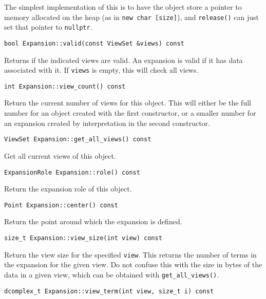The simplest implementation of this is to have the object store a pointer to
memory allocated on the heap (as in \texttt{new char [size]}), and
\texttt{release()} can just set that pointer to \texttt{nullptr}.

\begin{lstlisting}
bool Expansion::valid(const ViewSet &views) const
\end{lstlisting}

\noindent Returns if the indicated views are valid. An expansion is valid if it
has data associated with it. If \texttt{views} is empty, this will check all
views.

\begin{lstlisting}
int Expansion::view_count() const
\end{lstlisting}

\noindent Return the current number of views for this object. This will either
be the full number for an object created with the first constructor, or a
smaller number for an expansion created by interpretation in the second
constructor.

\begin{lstlisting}
ViewSet Expansion::get_all_views() const
\end{lstlisting}

\noindent Get all current views of this object.

\begin{lstlisting}
ExpansionRole Expansion::role() const
\end{lstlisting}

\noindent Return the expansion role of this object.

\begin{lstlisting}
Point Expansion::center() const
\end{lstlisting}

\noindent Return the point around which the expansion is defined.

\begin{lstlisting}
size_t Expansion::view_size(int view) const
\end{lstlisting}

\noindent Return the view size for the specified \texttt{view}. This returns
the number of terms in the expansion for the given view. Do not confuse this
with the size in bytes of the data in a given view, which can be obtained with
\texttt{get\_all\_views()}.

\begin{lstlisting}
dcomplex_t Expansion::view_term(int view, size_t i) const
\end{lstlisting}

